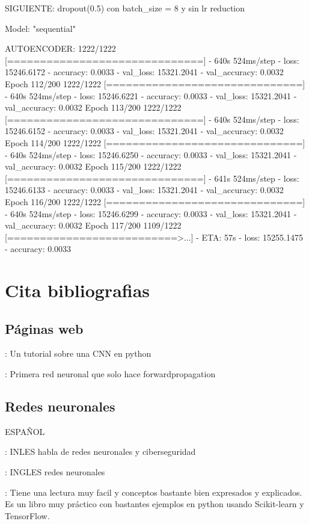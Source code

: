 \documentclass[11pt, a4paper]{article} %
\begin{document}
SIGUIENTE:  dropout(0.5) con batch_size = 8 y sin lr reduction 

Model: "sequential"







AUTOENCODER:
1222/1222 [==============================] - 640s 524ms/step - loss: 15246.6172 - accuracy: 0.0033 - val_loss: 15321.2041 - val_accuracy: 0.0032
Epoch 112/200
1222/1222 [==============================] - 640s 524ms/step - loss: 15246.6221 - accuracy: 0.0033 - val_loss: 15321.2041 - val_accuracy: 0.0032
Epoch 113/200
1222/1222 [==============================] - 640s 524ms/step - loss: 15246.6152 - accuracy: 0.0033 - val_loss: 15321.2041 - val_accuracy: 0.0032
Epoch 114/200
1222/1222 [==============================] - 640s 524ms/step - loss: 15246.6250 - accuracy: 0.0033 - val_loss: 15321.2041 - val_accuracy: 0.0032
Epoch 115/200
1222/1222 [==============================] - 641s 524ms/step - loss: 15246.6133 - accuracy: 0.0033 - val_loss: 15321.2041 - val_accuracy: 0.0032
Epoch 116/200
1222/1222 [==============================] - 640s 524ms/step - loss: 15246.6299 - accuracy: 0.0033 - val_loss: 15321.2041 - val_accuracy: 0.0032
Epoch 117/200
1109/1222 [==========================>...] - ETA: 57s - loss: 15255.1475 - accuracy: 0.0033   

\section{Cita bibliografias}
\subsection{Páginas web}


\citep{kaggle_cnn_tutorial} : Un tutorial sobre una CNN en python

\citep{conceptos_RN_DesdeCero} : Primera red neuronal que solo hace forwardpropagation


\subsection{Redes neuronales}
\citep{matich2001redes} ESPAÑOL 

\citep{stamp2022artificial} : INLES habla de redes neuronales y ciberseguridad

\citep{tang2007neural} : INGLES redes neuronales



\citep{mirjalili2020python} : Tiene una lectura muy facil y conceptos bastante bien expresados y explicados. Es un libro muy práctico con bastantes ejemplos en python usando Scikit-learn y TensorFlow.
\end{document}
